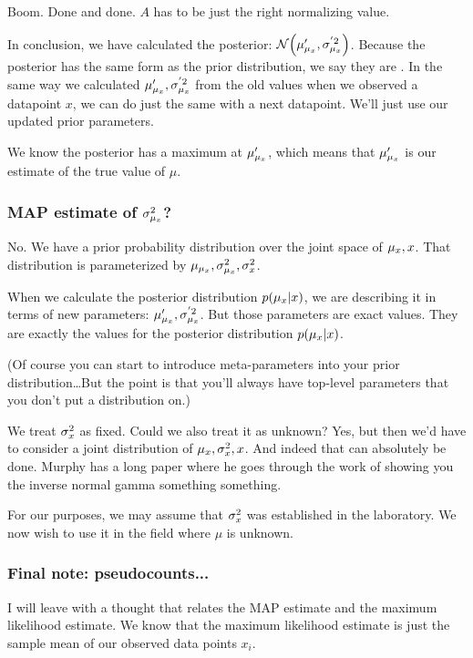 Boom. Done and done. $A$ has to be just the right normalizing value.

In conclusion, we have calculated the posterior:
$\mathcal{N}\mathopen{}\left( {\mu'_{\mu_x}, \sigma^{'2}_{\mu_x}} \right)\mathclose{}$. Because the posterior has the same form as
the prior distribution, we say they are . In the same
way we calculated $\mu'_{\mu_x}, \sigma^{'2}_{\mu_x}$ from the old values when we
observed a datapoint $x$, we can do just the same with a next datapoint.
We'll just use our updated prior parameters.

We know the posterior has a maximum at $\mu'_{\mu_x}$, which means that
$\mu'_{\mu_x}$ is our  estimate of the true
value of $\mu$.

\subsubsection{MAP estimate of $\sigma^2_{\mu_x}$?}

No. We have a prior probability distribution over the joint space of
$\mu_x, x$. That distribution is parameterized by $\mu_{\mu_x}, \sigma^2_{\mu_x},
\sigma^2_x$.

When we calculate the posterior distribution $p\mathopen{}\left( {\mu_x | x} \right)\mathclose{}$, we are
describing it in terms of new parameters: $\mu'_{\mu_x}, \sigma^{'2}_{\mu_x}$. But those
parameters are exact values. They are exactly the values for the
posterior distribution $p\mathopen{}\left( {\mu_x | x} \right)\mathclose{}$.

(Of course you can start to introduce meta-parameters into your prior
distribution\ldots But the point is that you'll always have top-level
parameters that you don't put a distribution on.)

We treat $\sigma^2_x$ as fixed. Could we also treat it as unknown? Yes, but
then we'd have to consider a joint distribution of $\mu_x, \sigma^2_x, x$. And
indeed that can absolutely be done. Murphy has a long paper where he
goes through the work of showing you the inverse normal gamma something
something.

For our purposes, we may assume that $\sigma^2_x$ was established in the
laboratory. We now wish to use it in the field where $\mu$ is unknown.

\subsubsection{Final note: pseudocounts...}

I will leave with a thought that relates the MAP estimate and the
maximum likelihood estimate. We know that the maximum likelihood
estimate is just the sample mean of our observed data points $x_i$.

